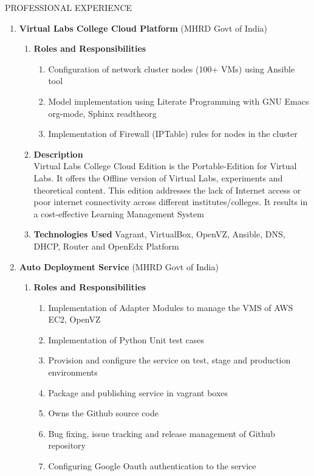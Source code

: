 \documentclass{resume} %
\newcommand{\blank}[1]{\hspace*{#1}}
\begin{document}
\begin{rSection}{PROFESSIONAL EXPERIENCE}
\begin{rSubsection}
\begin{enumerate}[label=\bfseries\arabic*]
\item \textbf {Virtual Labs College Cloud Platform} (MHRD Govt of India)
  \begin{enumerate}
    
  \item \textbf{Roles and Responsibilities }
    \begin{enumerate}
    \item Configuration of network cluster nodes (100+
      VMs) using Ansible tool
    \item Model implementation using Literate Programming with GNU Emacs
      org-mode, Sphinx readtheorg
    \item Implementation of Firewall (IPTable) rules for nodes in the
      cluster
    \end{enumerate}
    
  \item \textbf{Description } \\ \blank{2 cm} Virtual Labs College
    Cloud Edition is the Portable-Edition for Virtual Labs. It offers
    the Offline version of Virtual Labs, experiments and theoretical
    content. This edition addresses the lack of Internet access or
    poor internet connectivity across different
    institutes/colleges. It results in a cost-effective Learning
    Management System
    
  \item \textbf{Technologies Used } Vagrant, VirtualBox, OpenVZ,
    Ansible, DNS, DHCP, Router and OpenEdx Platform
  \end{enumerate}

\item \textbf {Auto Deployment Service} (MHRD Govt of India)
  \begin{enumerate}
    
  \item \textbf{Roles and Responsibilities}
    \begin{enumerate}
    \item Implementation of Adapter Modules to manage the VMS of AWS
      EC2, OpenVZ
    \item Implementation of Python Unit test cases
    \item Provision and configure the service on test, stage and
      production environments
    \item Package and publishing service in vagrant boxes
    \item Owns the Github source code
    \item Bug fixing, issue tracking and release management of Github
      repository
    \item Configuring Google Oauth authentication to the service
    \end{enumerate}
    

\end{enumerate}
\end{enumerate}
\end{rSubsection}
\end{rSection}
\end{document}
